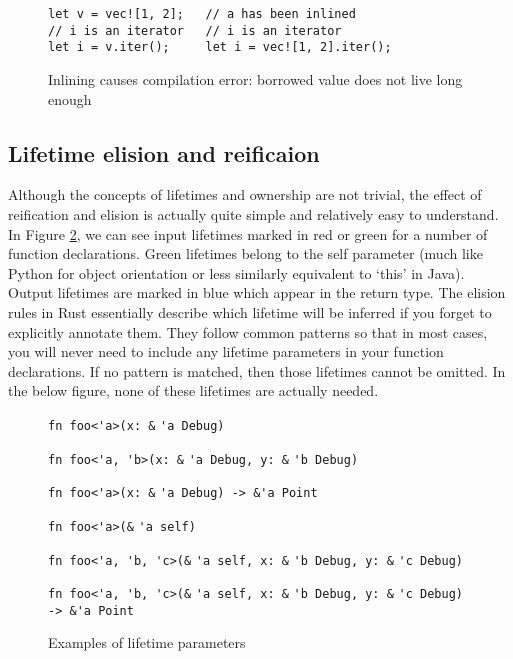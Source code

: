 \begin{figure}[h]
\begin{verbatim}
let v = vec![1, 2];   // a has been inlined
// i is an iterator   // i is an iterator     
let i = v.iter();     let i = vec![1, 2].iter();
\end{verbatim}
\caption{Inlining causes compilation error: borrowed value does not live long enough}
\label{Fig:inlinefail}
\end{figure}

\subsection{Lifetime elision and reificaion}

Although the concepts of lifetimes and ownership are not trivial, the effect of reification and elision is actually quite simple and relatively easy to understand. In Figure \ref{Fig:lifetimes}, we can see input lifetimes marked in red or green for a number of function declarations. Green lifetimes belong to the self parameter (much like Python for object orientation or less similarly equivalent to `this' in Java). Output lifetimes are marked in blue which appear in the return type. The elision rules in Rust essentially describe which lifetime will be inferred if you forget to explicitly annotate them. They follow common patterns so that in most cases, you will never need to include any lifetime parameters in your function declarations. If no pattern is matched, then those lifetimes cannot be omitted. In the below figure, none of these lifetimes are actually needed.

\begin{figure}
{\verb|fn foo<'a>(x: &|}
{\color{red} \verb|'a|}{\verb| Debug)|}

{\verb|fn foo<'a, 'b>(x: &|}
{\color{red} \verb|'a|}{\verb| Debug, y: &|}{\color{red} \verb|'b|}{\verb| Debug)|}

{\verb|fn foo<'a>(x: &|}
{\color{red} \verb|'a|}{\verb| Debug) -> &|}{\color{blue}\verb|'a|}{\verb| Point|}

{\verb|fn foo<'a>(&|}
{\color{green} \verb|'a|}{\verb| self)|}

{\verb|fn foo<'a, 'b, 'c>(&|}
{\color{green} \verb|'a|}{\verb| self, x: &|}{\color{red} \verb|'b|}{\verb| Debug, y: &|}
{\color{red} \verb|'c|}{\verb| Debug)|}

{\verb|fn foo<'a, 'b, 'c>(&|}
{\color{green} \verb|'a|}{\verb| self, x: &|}{\color{red} \verb|'b|}{\verb| Debug, y: &|}
{\color{red}\verb|'c|}{\verb| Debug) -> &|}{\color{blue}\verb|'a|}{\verb| Point|}

\caption{Examples of lifetime parameters}
\label{Fig:lifetimes}
\end{figure}

